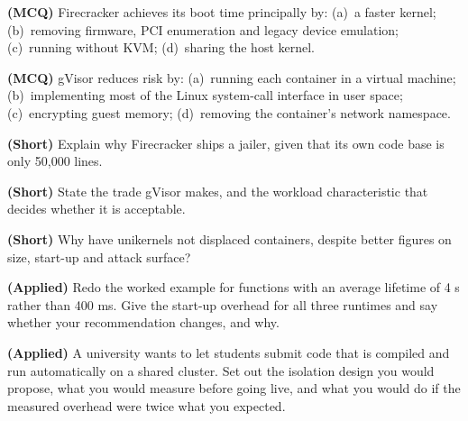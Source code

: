 \begin{reviewq}
  \item \textbf{(MCQ)} Firecracker achieves its boot time principally by:
        (a)~a faster kernel; (b)~removing firmware, PCI enumeration and legacy
        device emulation; (c)~running without KVM; (d)~sharing the host
        kernel.
  \item \textbf{(MCQ)} gVisor reduces risk by: (a)~running each container in a
        virtual machine; (b)~implementing most of the Linux system-call
        interface in user space; (c)~encrypting guest memory; (d)~removing the
        container's network namespace.
  \item \textbf{(Short)} Explain why Firecracker ships a jailer, given that its
        own code base is only 50{,}000 lines.
  \item \textbf{(Short)} State the trade gVisor makes, and the workload
        characteristic that decides whether it is acceptable.
  \item \textbf{(Short)} Why have unikernels not displaced containers, despite
        better figures on size, start-up and attack surface?
  \item \textbf{(Applied)} Redo the worked example for functions with an
        average lifetime of 4 s rather than 400 ms. Give the start-up overhead
        for all three runtimes and say whether your recommendation changes, and
        why.
  \item \textbf{(Applied)} A university wants to let students submit code that
        is compiled and run automatically on a shared cluster. Set out the
        isolation design you would propose, what you would measure before
        going live, and what you would do if the measured overhead were twice
        what you expected.
\end{reviewq}
